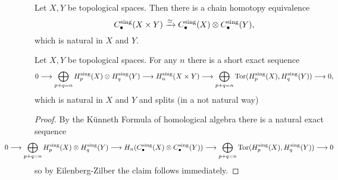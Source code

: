 
	\begin{theorem}
		Let $X,Y$ be topological spaces. Then there is a chain homotopy equivalence
		\begin{equation*}
			C_\bullet^\text{sing}(X \times Y) \xrightarrow{\simeq} C_\bullet^\text{sing}(X) \otimes C_\bullet^\text{sing}(Y),
		\end{equation*}
		which is natural in $X$ and $Y$.
	\end{theorem}
	\begin{sketch}

	\end{sketch}

	\begin{corollary}
		Let $X,Y$ be topological spaces. For any $n$ there is a short exact sequence
		\begin{align*}
			0 --> \bigoplus \limits_{p+q=n}H_p^\text{sing}(X) \otimes H_q^\text{sing}(Y) --> H_n^\text{sing}(X \times Y) --> \bigoplus \limits_{p+q=n} \operatorname{Tor}(H_p^\text{sing}(X),H_q^\text{sing}(Y)) --> 0,
		\end{align*}
		which is natural in $X$ and $Y$ and splits (in a not natural way) 
	\end{corollary}
	\begin{proof}
		By the Künneth Formula of homological algebra there is a natural exact sequence
		\begin{align*}
			\hspace{-1.5cm}
			0 --> \Oplus \limits_{p+q=n}H_p^\text{sing}(X) \tensor H_q^\text{sing}(Y) --> H_n(C_\bullet^\text{sing}(X) \tensor C_\bullet^\text{sing}(Y)) --> \Oplus \limits_{p+q=n} \Tor(H_p^\text{sing}(X),H_q^\text{sing}(Y)) --> 0
		\end{align*}
		so by Eilenberg-Zilber the claim follows immediately.
	\end{proof}

